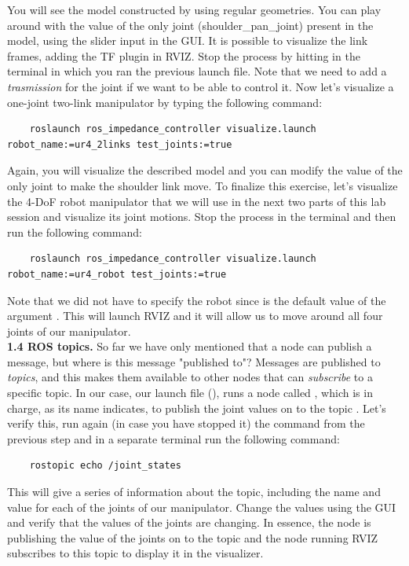 \documentclass[11pt]{article}
\begin{document}
\normalsize
You will see the model constructed by using regular geometries. You can play around with the value of the only joint (shoulder\_pan\_joint) present in the model, using the slider input in the GUI. It is possible to visualize the link frames, adding the TF plugin in RVIZ. Stop the process by hitting  in the terminal in which you ran the previous launch file. 
Note that we need to add a \textit{trasmission} for the joint if we want to be able to control it. 
Now let's visualize a one-joint two-link manipulator by typing the following command:
%
%
\footnotesize
\begin{verbatim}
	roslaunch ros_impedance_controller visualize.launch robot_name:=ur4_2links test_joints:=true
\end{verbatim} 
%
\normalsize
Again, you will visualize the described model and you can modify the value of the only joint to make the shoulder link move. To finalize this exercise, let's visualize the 4-DoF robot manipulator that we will use in the next two parts of this lab session and visualize its joint motions. Stop the process in the terminal and then run the following command:
%
%
\footnotesize
\begin{verbatim}
	roslaunch ros_impedance_controller visualize.launch robot_name:=ur4_robot test_joints:=true
\end{verbatim} 
\normalsize
Note that we did not have to specify the robot since  is the default value of the argument . This will launch RVIZ and it will allow us to move around all four joints of our manipulator.\\

\textbf{1.4 ROS topics.} So far we have only mentioned that a node can publish a message, but where is this message "published to"? Messages are published to \textit{topics}, and this makes them available to other nodes that can \textit{subscribe} to a specific topic. In our case, our launch file (), runs a node called , which is in charge, as its name indicates, to publish the joint values on to the topic . Let's verify this, run again (in case you have stopped it) the command from the previous step and in a separate terminal run the following command:
\begin{verbatim}
	rostopic echo /joint_states
\end{verbatim}
This will give a series of information about the  topic, including the name and value for each of the joints of our manipulator. Change the values using the GUI and verify that the values of the joints are changing. In essence, the  node is publishing the value of the joints on to the  topic and the node running RVIZ subscribes to this topic to display it in the visualizer.
\end{document}
